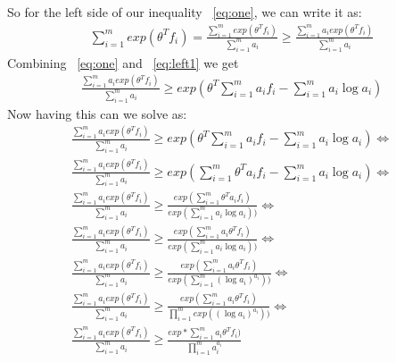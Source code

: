 So for the left side of our inequality ~\ref{eq:one}, we can write it as:
\begin{align}\label{eq:left1}
\displaystyle\sum_{i=1}^{m}exp(\theta^T f_i) = \frac{\displaystyle\sum_{i=1}^{m}exp(\theta^T f_i)}{\displaystyle\sum_{i=1}^{m}a_i} \geq \frac{\displaystyle\sum_{i=1}^{m}a_i exp(\theta^T f_i)}{\displaystyle\sum_{i=1}^{m}a_i}
\end{align}
Combining ~\ref{eq:one} and ~\ref{eq:left1} we get
\begin{align*}
\frac{\displaystyle\sum_{i=1}^{m}a_i exp(\theta^T f_i)}{\displaystyle\sum_{i=1}^{m}a_i} \geq exp(\theta^T \displaystyle\sum_{i=1}^{m}a_if_i - \displaystyle\sum_{i=1}^{m}a_i\log a_i)
\end{align*}
Now having this can we solve as:
\begin{align*}
\frac{\displaystyle\sum_{i=1}^{m}a_i exp(\theta^T f_i)}{\displaystyle\sum_{i=1}^{m}a_i} \geq exp(\theta^T \displaystyle\sum_{i=1}^{m}a_i f_i - \displaystyle\sum_{i=1}^{m}a_i\log a_i) \Leftrightarrow \\
\frac{\displaystyle\sum_{i=1}^{m}a_i exp(\theta^T f_i)}{\displaystyle\sum_{i=1}^{m}a_i} \geq exp(\displaystyle\sum_{i=1}^{m}\theta^T a_i f_i - \displaystyle\sum_{i=1}^{m}a_i\log a_i) \Leftrightarrow \\
\frac{\displaystyle\sum_{i=1}^{m}a_i exp(\theta^T f_i)}{\displaystyle\sum_{i=1}^{m}a_i} \geq \frac{exp(\displaystyle\sum_{i=1}^{m}\theta^T a_i f_i)}{exp(\displaystyle\sum_{i=1}^{m}a_i\log a_i))} \Leftrightarrow \\
\frac{\displaystyle\sum_{i=1}^{m}a_i exp(\theta^T f_i)}{\displaystyle\sum_{i=1}^{m}a_i} \geq \frac{exp(\displaystyle\sum_{i=1}^{m}a_i\theta^T f_i)}{exp(\displaystyle\sum_{i=1}^{m}a_i\log a_i))} \Leftrightarrow \\
\frac{\displaystyle\sum_{i=1}^{m}a_i exp(\theta^T f_i)}{\displaystyle\sum_{i=1}^{m}a_i} \geq \frac{exp(\displaystyle\sum_{i=1}^{m}a_i\theta^T f_i)}{exp(\displaystyle\sum_{i=1}^{m}(\log a_i)^{a_i}))} \Leftrightarrow \\
\frac{\displaystyle\sum_{i=1}^{m}a_i exp(\theta^T f_i)}{\displaystyle\sum_{i=1}^{m}a_i} \geq \frac{exp(\displaystyle\sum_{i=1}^{m}a_i\theta^T f_i)}{\displaystyle\prod_{i=1}^{m}exp((\log a_i)^{a_i}))} \Leftrightarrow \\
\frac{\displaystyle\sum_{i=1}^{m}a_i exp(\theta^T f_i)}{\displaystyle\sum_{i=1}^{m}a_i} \geq \frac{exp*\displaystyle\sum_{i=1}^{m}a_i\theta^T f_i)}{\displaystyle\prod_{i=1}^{m}a_i^{a_i}} 
\end{align*}

